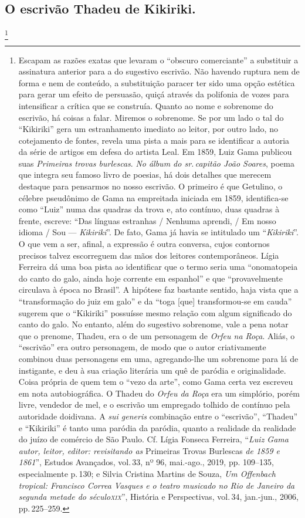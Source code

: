 \subsection{O escrivão Thadeu de Kikiriki.}\footnote{ Escapam as razões exatas que
  levaram o ``obscuro comerciante'' a substituir a assinatura anterior
  para a do sugestivo escrivão. Não havendo ruptura nem de forma e nem
  de conteúdo, a substituição paracer ter sido uma opção estética para
  gerar um efeito de persuasão, quiçá através da polifonia de vozes para
  intensificar a crítica que se construía. Quanto ao nome e sobrenome do
  escrivão, há coisas a falar. Miremos o sobrenome. Se por um lado o tal
  do ``Kikiriki'' gera um estranhamento imediato ao leitor, por outro
  lado, no cotejamento de fontes, revela uma pista a mais para se
  identificar a autoria da série de artigos em defesa do artista Leal.
  Em 1859, Luiz Gama publicou suas \emph{Primeiras trovas burlescas}.
  \emph{No álbum do sr.\,capitão João Soares}, poema que integra seu
  famoso livro de poesias, há dois detalhes que merecem destaque para
  pensarmos no nosso escrivão. O primeiro é que Getulino, o célebre
  pseudônimo de Gama na empreitada iniciada em 1859, identifica-se como
  ``Luiz'' numa das quadras da trova e, ato contínuo, duas quadras à
  frente, escreve: ``Das línguas estranhas / Nenhuma aprendi, / Em nosso
  idioma / Sou --- \emph{Kikiriki}''. De fato, Gama já havia se intitulado
  um ``\emph{Kikiriki}''. O que vem a ser, afinal, a expressão é outra
  conversa, cujos contornos precisos talvez escorreguem das mãos dos
  leitores contemporâneos. Lígia Ferreira dá uma boa pista ao
  identificar que o termo seria uma ``onomatopeia do canto do galo, ainda
  hoje corrente em espanhol'' e que ``provavelmente circulava à época no
  Brasil''. A hipótese faz bastante sentido, haja vista que a
  ``transformação do juiz em galo'' e da ``toga {[}que{]} transformou-se em
  cauda'' sugerem que o ``Kikiriki'' possuísse mesmo relação com algum
  significado do canto do galo. No entanto, além do sugestivo sobrenome,
  vale a pena notar que o prenome, Thadeu, era o de um personagem de
  \emph{Orfeu na Roça}. Aliás, o ``escrivão'' era outro personagem, de
  modo que o autor criativamente combinou duas personagens em uma,
  agregando-lhe um sobrenome para lá de instigante, e deu à sua criação
  literária um quê de paródia e originalidade. Coisa própria de quem tem
  o ``vezo da arte'', como Gama certa vez escreveu em nota autobiográfica.
  O Thadeu do \emph{Orfeu da Roça} era um simplório, porém livre,
  vendedor de mel, e o escrivão um empregado tolhido de contínuo pela
  autoridade doidivana. A \emph{sui generis} combinação entre o
  ``escrivão'', ``Thadeu'' e ``Kikiriki'' é tanto uma paródia da paródia,
  quanto a realidade da realidade do juízo de comércio de São Paulo. Cf.
  Lígia Fonseca Ferreira, ``\emph{Luiz Gama autor, leitor, editor:
  revisitando as} Primeiras Trovas Burlescas \emph{de 1859 e 1861}'',
  Estudos Avançados, vol.\,33, nº 96, mai.-ago., 2019, pp. 109--135,
  especialmente p.\,130; e Silvia Cristina Martins de Souza, \emph{Um
  Offenbach tropical: Francisco Correa Vasques e o teatro musicado no
  Rio de Janeiro da segunda metade do século\textsc{xix}}'', História e
  Perspectivas, vol.\,34, jan.-jun., 2006, pp.\,225--259.}

